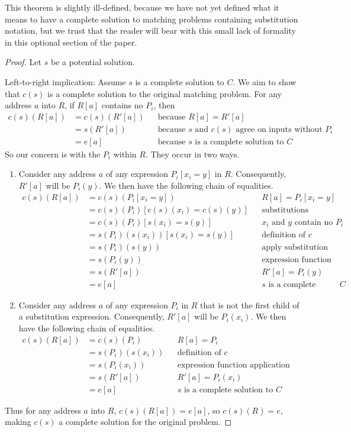 \documentclass{article}
\begin{document}
This theorem is slightly ill-defined, because we have not yet defined what it means to have a complete solution to matching problems containing substitution notation, but we trust that the reader will bear with this small lack of formality in this optional section of the paper.

\begin{proof}
Let $s$ be a potential solution.

Left-to-right implication:  Assume $s$ is a complete solution to $C$.  We aim to show that $c(s)$ is a complete solution to the original matching problem.  For any address $a$ into $R$, if $R[a]$ contains no $P_i$, then
	\begin{align*}
		c(s)(R[a])	&=	c(s)(R'[a])		&&	\text{because $R[a]=R'[a]$}	\\
					&=	s(R'[a])		&&	\text{because $s$ and $c(s)$ agree on inputs without $P_i$}	\\
					&=	e[a]			&&	\text{because $s$ is a complete solution to $C$}
	\end{align*}
So our concern is with the $P_i$ within $R$.  They occur in two ways.
\begin{enumerate}
\item	Consider any address $a$ of any expression $P_i[x_i=y]$ in $R$.  Consequently, $R'[a]$ will be $P_i(y)$.  We then have the following chain of equalities.
		\begin{align*}
			c(s)(R[a])	&=	c(s)(P_i[x_i=y])				&&	\text{$R[a]=P_i[x_i=y]$}	\\
						&=	c(s)(P_i)[c(s)(x_i)=c(s)(y)]	&&	\text{substitutions commute}	\\
						&=	c(s)(P_i)[s(x_i)=s(y)]			&&	\text{$x_i$ and $y$ contain no $P_i$}	\\
						&=	s(P_i)(s(x_i))[s(x_i)=s(y)]		&&	\text{definition of $c$}	\\
						&=	s(P_i)(s(y))					&&	\text{apply substitution}	\\
						&=	s(P_i(y))						&&	\text{expression function application structure}	\\
						&=	s(R'[a])						&&	\text{$R'[a]=P_i(y)$}	\\
						&=	e[a]							&&	\text{$s$ is a complete solution to $C$}
		\end{align*}
\item	Consider any address $a$ of any expression $P_i$ in $R$ that is not the first child of a substitution expression.  Consequently, $R'[a]$ will be $P_i(x_i)$.  We then have the following chain of equalities.
		\begin{align*}
			c(s)(R[a])	&=	c(s)(P_i)				&&	\text{$R[a]=P_i$}	\\
						&=	s(P_i)(s(x_i))			&&	\text{definition of $c$}	\\
						&=	s(P_i(x_i))				&&	\text{expression function application structure}	\\
						&=	s(R'[a])				&&	\text{$R'[a]=P_i(x_i)$}	\\
						&=	e[a]					&&	\text{$s$ is a complete solution to $C$}
		\end{align*}
\end{enumerate}
Thus for any address $a$ into $R$, $c(s)(R[a])=e[a]$, so $c(s)(R)=e$, making $c(s)$ a complete solution for the original problem.


\end{proof}
\end{document}
